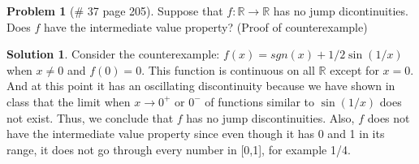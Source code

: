 \documentclass{article}
\theoremstyle{definition}
\newtheorem*{soln}{Solution}
\newtheorem*{prob}{Problem}
\theoremstyle{theorem}
\newcommand{\R}{\mathbb{R}}
\begin{document}
\begin{prob}[\# 37  page 205]
    Suppose that $f: \R \to \R$ has no jump dicontinuities. Does $f$ have the intermediate value property? (Proof of counterexample)
\end{prob}
\begin{soln}
    Consider the counterexample: $f(x) =sgn(x) + 1/2\sin(1/x)$ when $x\neq 0$ and $f(0)=0$. This function is continuous on all $\R$ except for $x=0$. And at  this point it has an oscillating discontinuity because we have shown in class that the limit when $x\to 0^+$ or $0^-$ of functions similar to $\sin(1/x)$ does not exist. Thus, we conclude that $f$ has no jump discontinuities. Also, $f$ does not have the intermediate value property since even though it has 0  and  1 in its range, it does not go through every number in [0,1], for example 1/4.
\end{soln}
\vspace{1in}
\end{document}
